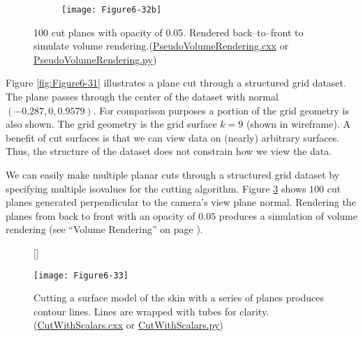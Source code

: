 \begin{figure}[htb]
	\begin{subfigure}[h]{0.48\linewidth}
		\caption{}
		\label{fig:Figure6-32a}
	\end{subfigure}
	\hfill
	\begin{subfigure}[h]{0.48\linewidth}
		\texttt{[image: Figure6-32b]}
		\caption{}
		\label{fig:Figure6-32b}
	\end{subfigure}
	\caption{100 cut planes with opacity of 0.05. Rendered back--to--front to simulate	volume rendering.(\href{https://lorensen.github.io/VTKExamples/site/Cxx/VolumeRendering/PseudoVolumeRendering}{PseudoVolumeRendering.cxx} or \href{https://lorensen.github.io/VTKExamples/site/Python/VolumeRendering/PseudoVolumeRendering/}{PseudoVolumeRendering.py})}\label{fig:Figure6-32}
\end{figure}

Figure \ref{fig:Figure6-31} illustrates a plane cut through a structured grid dataset. The plane passes through the center of the dataset with normal $(-0.287, 0, 0.9579)$. For comparison purposes a portion of the grid geometry is also shown. The grid geometry is the grid surface $k=9$ (shown in wireframe). A benefit of cut surfaces is that we can view data on (nearly) arbitrary surfaces. Thus, the structure of the dataset does not constrain how we view the data.

We can easily make multiple planar cuts through a structured grid dataset by specifying multiple isovalues for the cutting algorithm. Figure \ref{fig:Figure6-32} shows $100$ cut planes generated perpendicular to the camera's view plane normal. Rendering the planes from back to front with an opacity of $0.05$ produces a simulation of volume rendering (see ``Volume Rendering'' on page \pageref{sec:volume_rendering} ).

\begin{figure}[!htb]
	[\FBwidth]
	{\caption{Cutting a surface model of the skin with a series of planes produces contour lines. Lines are wrapped with tubes for clarity. (\href{https://lorensen.github.io/VTKExamples/site/Cxx/VisualizationAlgorithms/CutWithScalars/}{CutWithScalars.cxx} or \href{https://lorensen.github.io/VTKExamples/site/Python/VisualizationAlgorithms/CutWithScalars/}{CutWithScalars.py})}\label{fig:Figure6-33}}
	{\texttt{[image: Figure6-33]}}
\end{figure}

